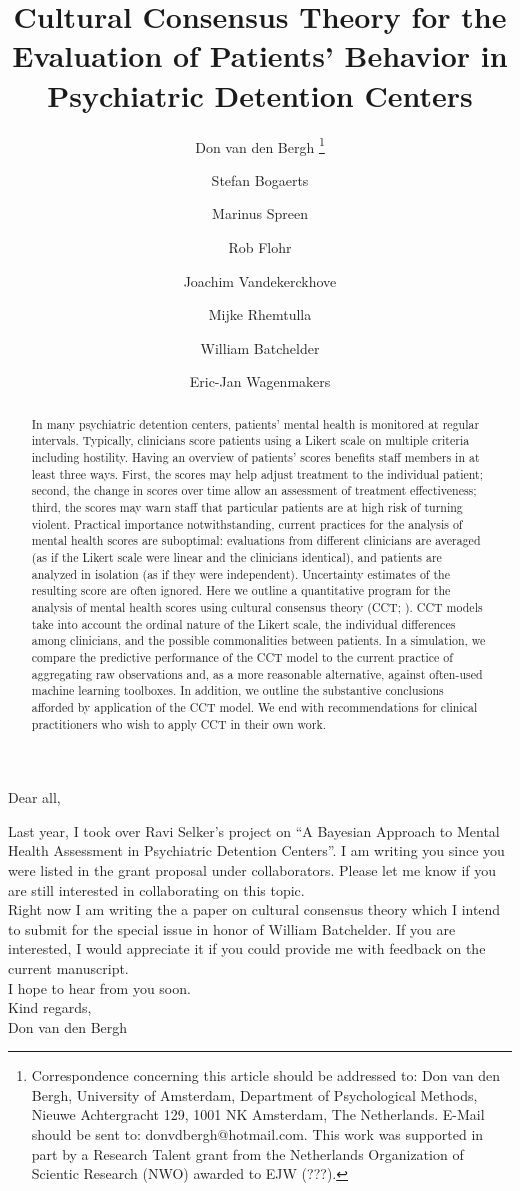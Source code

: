 \documentclass{article}
\title{Cultural Consensus Theory for the Evaluation of Patients’ Behavior in Psychiatric  Detention Centers}
\author[1]{Don van den Bergh%
\thanks{Correspondence concerning this article should be addressed to: Don van den Bergh, University of Amsterdam, Department of Psychological Methods, Nieuwe Achtergracht 129, 1001 NK Amsterdam, The Netherlands. E-Mail should be sent to: donvdbergh@hotmail.com. This work was supported in part by a Research Talent grant from the Netherlands Organization of Scientic Research (NWO) awarded to EJW (???).
}}
\author[2]{Stefan Bogaerts}
\author[3]{Marinus Spreen}
\author[4]{Rob Flohr}
\author[5]{Joachim Vandekerckhove}
\author[6]{Mijke Rhemtulla}
\author[5]{William Batchelder}
\author[1]{Eric-Jan Wagenmakers}
\affil[1]{University of Amsterdam}
\affil[2]{University of Tilburg}
\affil[3]{Mesdag Clinic}
\affil[4]{Stenden University of Applied Sciences}
\affil[5]{University of California Irvine}
\affil[6]{??}
\date{}
\begin{document}
\listoftodos

\noindent Dear all,

\noindent Last year, I took over Ravi Selker's project on ``A Bayesian Approach to Mental Health Assessment in Psychiatric Detention Centers''. I am writing you since you were listed in the grant proposal under collaborators. Please let me know if you are still interested in collaborating on this topic. \\

\noindent Right now I am writing the a paper on cultural consensus theory which I intend to submit for the special issue in honor of William Batchelder. If you are interested, I would appreciate it if you could provide me with feedback on the current manuscript.\\
I hope to hear from you soon.\\

\noindent Kind regards,\\
Don van den Bergh

\newpage

\maketitle

\begin{abstract}
In many psychiatric detention centers, patients' mental health is monitored at regular intervals. Typically, clinicians score patients using a Likert scale on multiple criteria including hostility. Having an overview of patients’ scores benefits staff members in at least three ways. First, the scores may help adjust treatment to the individual patient; second, the change in scores over time allow an assessment of treatment effectiveness; third, the scores may warn staff that particular patients are at high risk of turning violent. Practical importance notwithstanding, current practices for the analysis of mental health scores are suboptimal: evaluations from different clinicians are averaged (as if the Likert scale were linear and the clinicians identical), and patients are analyzed in isolation (as if they were independent). Uncertainty estimates of the resulting score are often ignored. Here we outline a quantitative program for the analysis of mental health scores using cultural consensus theory (CCT; ). CCT models take into account the ordinal nature of the Likert scale, the individual differences among clinicians, and the possible commonalities between patients. In a simulation, we compare the predictive performance of the CCT model to the current practice of aggregating raw observations and, as a more reasonable alternative, against often-used machine learning toolboxes. In addition, we outline the substantive conclusions afforded by application of the CCT model. We end with recommendations for clinical practitioners who wish to apply CCT in their own work. 
\end{abstract}
\end{document}

